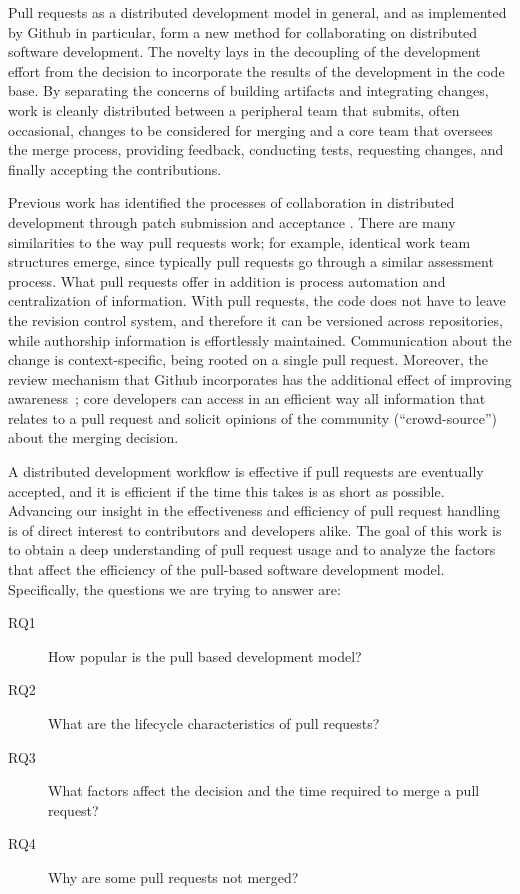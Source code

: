 \documentclass{sig-alternate}
\begin{document}
Pull requests as a distributed development model in general, and as implemented
by Github in particular, form a new method for collaborating on distributed
software development. The novelty lays in the decoupling of the development
effort from the decision to incorporate the results of the development in the
code base. By separating the concerns of building artifacts and integrating
changes, work is cleanly distributed between a peripheral team that submits, often
occasional, changes to be considered for merging and a core team that oversees
the merge process, providing feedback, conducting tests, requesting changes, and
finally accepting the contributions.

Previous work has identified the processes of collaboration in distributed
development through patch submission and acceptance \cite{MOCKU02, Bird07,
Weiss08}. There are many similarities to the way pull requests work; for
example, identical work team structures emerge, since typically pull requests go
through a similar assessment process. What pull requests offer in addition is
process automation and centralization of information. With pull requests, the
code does not have to leave the revision control system, and therefore it can be
versioned across repositories, while authorship information is effortlessly
maintained. Communication about the change is context-specific, being rooted on
a single pull request. Moreover, the review mechanism that Github incorporates
has the additional effect of improving awareness~\cite{Dabbi12}; core developers
can access in an efficient way all information that relates to a pull request
and solicit opinions of the community (``crowd-source'') about the merging
decision.

A distributed development workflow is effective if pull requests are eventually
accepted, and it is efficient if the time this takes is as short as possible.
Advancing our insight in the effectiveness and efficiency of pull request
handling is of direct interest to contributors and developers alike. The goal of
this work is to obtain a deep understanding of pull request usage and to analyze
the factors that affect the efficiency of the pull-based software development
model. Specifically, the questions we are trying to answer are: 

\begin{description}
  
  \item[RQ1] How popular is the pull based development model?

  \item[RQ2] What are the lifecycle characteristics of pull requests?
    
  \item[RQ3] What factors affect the decision and the time required to merge a pull request?

  \item[RQ4] Why are some pull requests not merged?

\end{description}
\end{document}
